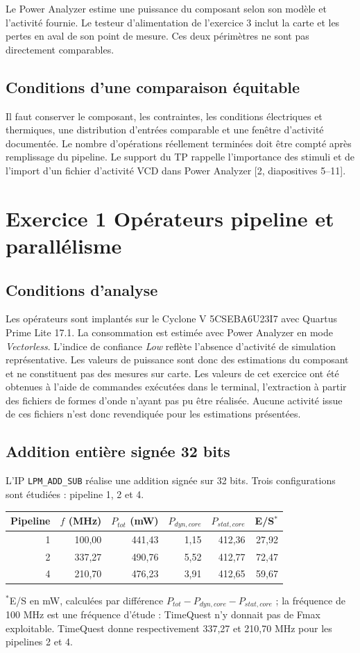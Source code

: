 \documentclass[11pt,a4paper]{article}
\begin{document}
Le Power Analyzer estime une puissance du composant selon son modèle et l'activité fournie. Le testeur d'alimentation de l'exercice 3 inclut la carte et les pertes en aval de son point de mesure. Ces deux périmètres ne sont pas directement comparables.

\subsection{Conditions d'une comparaison équitable}
Il faut conserver le composant, les contraintes, les conditions électriques et thermiques, une distribution d'entrées comparable et une fenêtre d'activité documentée. Le nombre d'opérations réellement terminées doit être compté après remplissage du pipeline. Le support du TP rappelle l'importance des stimuli et de l'import d'un fichier d'activité VCD dans Power Analyzer [2, diapositives 5--11].

\newpage
\begingroup\small\section{Exercice 1 Opérateurs pipeline et parallélisme}
\subsection{Conditions d'analyse}
Les opérateurs sont implantés sur le Cyclone V 5CSEBA6U23I7 avec Quartus Prime Lite 17.1. La consommation est estimée avec Power Analyzer en mode \emph{Vectorless}. L'indice de confiance \emph{Low} reflète l'absence d'activité de simulation représentative. Les valeurs de puissance sont donc des estimations du composant et ne constituent pas des mesures sur carte. Les valeurs de cet exercice ont été obtenues à l'aide de commandes exécutées dans le terminal, l'extraction à partir des fichiers de formes d'onde n'ayant pas pu être réalisée. Aucune activité issue de ces fichiers n'est donc revendiquée pour les estimations présentées.

\subsection{Addition entière signée 32 bits}
L'IP \texttt{LPM\_ADD\_SUB} réalise une addition signée sur 32 bits. Trois configurations sont étudiées : pipeline 1, 2 et 4.
\begin{center}
\begin{tabular}{@{}rrrrrr@{}}
\toprule
Pipeline & $f$ (MHz) & $P_{tot}$ (mW) & $P_{dyn,core}$ & $P_{stat,core}$ & E/S$^*$\\
\midrule
1 & 100,00 & 441,43 & 1,15 & 412,36 & 27,92\\
2 & 337,27 & 490,76 & 5,52 & 412,77 & 72,47\\
4 & 210,70 & 476,23 & 3,91 & 412,65 & 59,67\\
\bottomrule
\end{tabular}
\end{center}
$^*$E/S en mW, calculées par différence $P_{tot}-P_{dyn,core}-P_{stat,core}$ ; la fréquence de 100 MHz est une fréquence d'étude : TimeQuest n'y donnait pas de Fmax exploitable. TimeQuest donne respectivement 337,27 et 210,70 MHz pour les pipelines 2 et 4.
\end{document}
